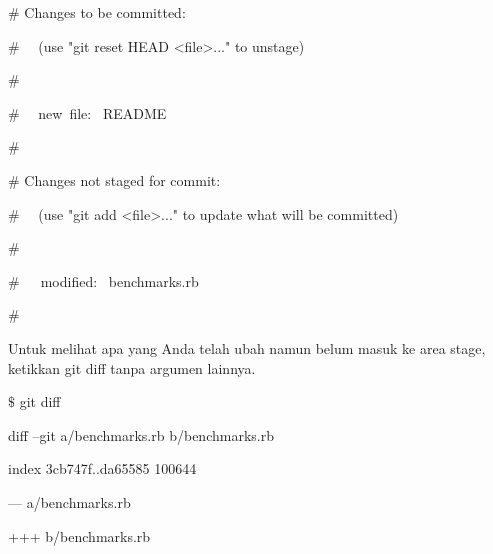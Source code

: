 \noindent 
{\fontsize{14pt}{14pt}\selectfont  $  \#  $ Changes to be committed: \\} \par
\noindent 
{\fontsize{14pt}{14pt}\selectfont  $  \#  $~~ (use "git reset HEAD <file>..." to unstage) \\} \par
\noindent 
{\fontsize{14pt}{14pt}\selectfont  $  \#  $ \\} \par
\noindent 
{\fontsize{14pt}{14pt}\selectfont  $  \#  $~~ new~file:~  README \\} \par
\noindent 
{\fontsize{14pt}{14pt}\selectfont  $  \#  $ \\} \par
\noindent 
{\fontsize{14pt}{14pt}\selectfont  $  \#  $ Changes not staged for commit: \\} \par
\noindent 
{\fontsize{14pt}{14pt}\selectfont  $  \#  $~~ (use "git add <file>..." to update what will be committed) \\} \par
\noindent 
{\fontsize{14pt}{14pt}\selectfont  $  \#  $ \\} \par
\noindent 
{\fontsize{14pt}{14pt}\selectfont  $  \#  $~~~modified:~  benchmarks.rb \\} \par
\noindent 
{\fontsize{14pt}{14pt}\selectfont  $  \#  $ \\} \par
\noindent 
{\fontsize{14pt}{14pt}\selectfont Untuk melihat apa yang Anda telah ubah namun belum masuk ke area stage, ketikkan $  $git diff $  $tanpa argumen lainnya. \\} \par
\noindent 
{\fontsize{14pt}{14pt}\selectfont  $  \$  $ git diff \\} \par
\noindent 
{\fontsize{14pt}{14pt}\selectfont diff --git a/benchmarks.rb b/benchmarks.rb \\} \par
\noindent 
{\fontsize{14pt}{14pt}\selectfont index 3cb747f..da65585 100644 \\} \par
\noindent 
{\fontsize{14pt}{14pt}\selectfont --- a/benchmarks.rb \\} \par
\noindent 
{\fontsize{14pt}{14pt}\selectfont +++ b/benchmarks.rb \\} \par
